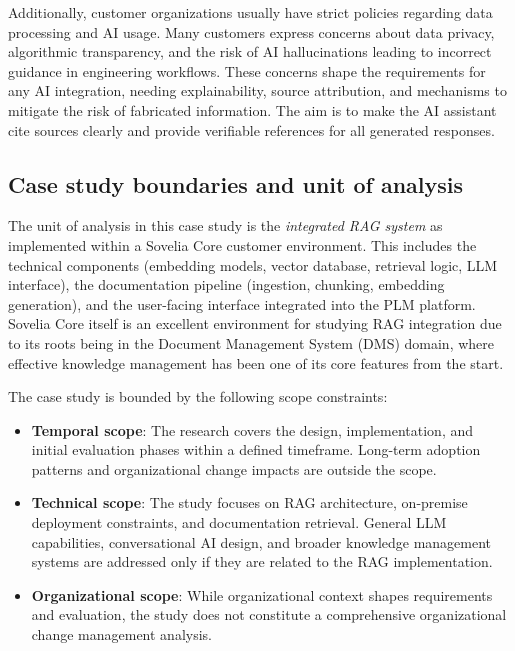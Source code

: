 Additionally, customer organizations usually have strict policies regarding data processing and AI usage. Many customers express concerns about data privacy, algorithmic transparency, and the risk of AI hallucinations leading to incorrect guidance in engineering workflows. These concerns shape the requirements for any AI integration, needing explainability, source attribution, and mechanisms to mitigate the risk of fabricated information. The aim is to make the AI assistant cite sources clearly and provide verifiable references for all generated responses.

\subsection{Case study boundaries and unit of analysis}
\label{subsec:case-boundaries}

The unit of analysis in this case study is the \emph{integrated RAG system} as implemented within a Sovelia Core customer environment. This includes the technical components (embedding models, vector database, retrieval logic, LLM interface), the documentation pipeline (ingestion, chunking, embedding generation), and the user-facing interface integrated into the PLM platform. Sovelia Core itself is an excellent environment for studying RAG integration due to its roots being in the Document Management System (DMS) domain, where effective knowledge management has been one of its core features from the start.

The case study is bounded by the following scope constraints:

\begin{itemize}
    \item \textbf{Temporal scope}: The research covers the design, implementation, and initial evaluation phases within a defined timeframe. Long-term adoption patterns and organizational change impacts are outside the scope.
    \item \textbf{Technical scope}: The study focuses on RAG architecture, on-premise deployment constraints, and documentation retrieval. General LLM capabilities, conversational AI design, and broader knowledge management systems are addressed only if they are related to the RAG implementation.
    \item \textbf{Organizational scope}: While organizational context shapes requirements and evaluation, the study does not constitute a comprehensive organizational change management analysis.
\end{itemize}

